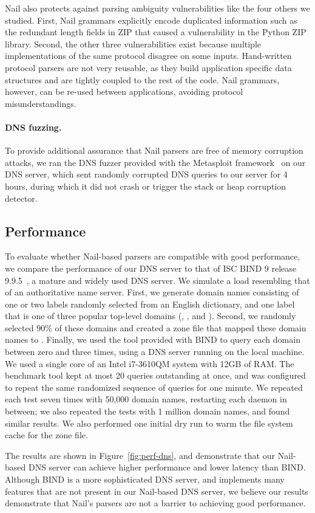 Nail also protects against parsing ambiguity vulnerabilities like the four others we studied. First,
Nail grammars explicitly encode duplicated information such as the redundant length fields in ZIP
that caused a vulnerability in the Python ZIP library. Second, the other three vulnerabilities exist
because multiple implementations of the same protocol disagree on some inputs. Hand-written protocol
parsers are not very reusable, as they build application specific data structures and are tightly
coupled to the rest of the code. Nail grammars, however, can be re-used between applications,
avoiding protocol misunderstandings.

\paragraph{DNS fuzzing.}

To provide additional assurance that Nail parsers are free of memory
corruption attacks, we ran the DNS fuzzer provided with the Metasploit
framework~\cite{mspframework} on our DNS server, which sent randomly
corrupted DNS queries to our server for 4 hours, during which it did
not crash or trigger the stack or heap corruption detector.


\subsection{Performance}

To evaluate whether Nail-based parsers are compatible with good
performance, we compare the performance of our DNS server to that of ISC
BIND 9 release 9.9.5~\cite{bind9}, a mature and widely used DNS server.
We simulate a load resembling that of an authoritative name server.
First, we generate domain names consisting of one or two labels randomly
selected from an English dictionary, and one label that is one of
three popular top-level domains (, , and ).
Second, we randomly selected 90\% of these domains and created a zone
file that mapped these domain names to .  Finally, we used
the  tool provided with BIND to query each domain between
zero and three times, using a DNS server running on the local machine.
We used a single core of an Intel i7-3610QM system with 12GB of RAM.
The benchmark tool kept at most 20 queries outstanding at once, and
was configured to repeat the same randomized sequence of queries for
one minute.  We repeated each test seven times with 50,000 domain names,
restarting each daemon in between; we also repeated the tests with 1
million domain names, and found similar results.  We also performed one
initial dry run to warm the file system cache for the zone file.

The results are shown in Figure~\ref{fig:perf-dns}, and demonstrate that
our Nail-based DNS server can achieve higher performance and lower latency
than BIND\@.  Although BIND is a more sophisticated DNS server,
and implements many features that are not present in our Nail-based DNS
server, we believe our results demonstrate that Nail's parsers are not
a barrier to achieving good performance.



